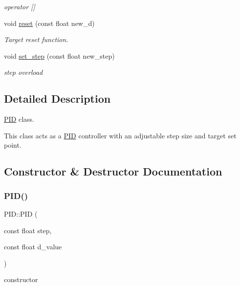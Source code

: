 \begin{DoxyCompactItemize}
\begin{DoxyCompactList}\small\item\em operator \mbox{[}\mbox{]} \end{DoxyCompactList}\item 
void \hyperlink{classPID_a87b5447cef6364adc24f34f57fc1e976}{reset} (const float new\+\_\+d)
\begin{DoxyCompactList}\small\item\em Target reset function. \end{DoxyCompactList}\item 
void \hyperlink{classPID_ac22392c392dd8a95806fce3708eb3090}{set\+\_\+step} (const float new\+\_\+step)
\begin{DoxyCompactList}\small\item\em step overload \end{DoxyCompactList}\end{DoxyCompactItemize}


\subsection{Detailed Description}
\hyperlink{classPID}{P\+ID} class. 

This class acts as a \hyperlink{classPID}{P\+ID} controller with an adjustable step size and target set point. 

\subsection{Constructor \& Destructor Documentation}
\mbox{\label{classPID_a8aba942356f95f82b69f9355411255a8}} 
\subsubsection{\texorpdfstring{P\+I\+D()}{PID()}\hspace{0.1cm}{\footnotesize\ttfamily [1/3]}}
{\footnotesize\ttfamily P\+I\+D\+::\+P\+ID (\begin{DoxyParamCaption}\item[{const float}]{step,  }\item[{const float}]{d\+\_\+value }\end{DoxyParamCaption})}



constructor 

